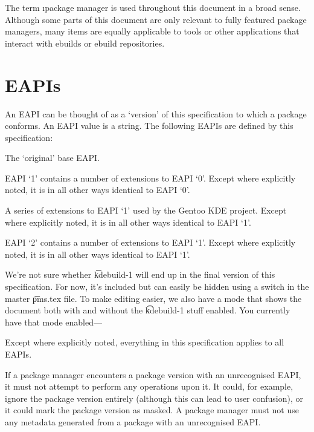 The term \i{package manager} is used throughout this document in a broad sense. Although some parts
of this document are only relevant to fully featured package managers, many items are equally
applicable to tools or other applications that interact with ebuilds or ebuild repositories.

\section{EAPIs}

An EAPI can be thought of as a `version' of this specification to which a package conforms. An EAPI
value is a string. The following EAPIs are defined by this specification:

\begin{description}
\item[0] The `original' base EAPI.
\item[1] EAPI `1' contains a number of extensions to EAPI `0'. Except where explicitly noted, it is
    in all other ways identical to EAPI `0'.
\IFKDEBUILDELSE
{
    \item[kdebuild-1] A series of extensions to EAPI `1' used by the Gentoo KDE project. Except where
        explicitly noted, it is in all other ways identical to EAPI `1'.
}{
}
\item[2] EAPI `2' contains a number of extensions to EAPI `1'. Except where explicitly noted, it is
    in all other ways identical to EAPI `1'.
\end{description}

{
    \note We're not sure whether \t{kdebuild-1} will end up in the final version of this
    specification. For now, it's included but can easily be hidden using a switch in the master
    \t{pms.tex} file. To make editing easier, we also have a mode that shows the document both with
    and without the \t{kdebuild-1} stuff enabled. You currently have that mode enabled---
}{
}

Except where explicitly noted, everything in this specification applies to all EAPIs.

If a package manager encounters a package version with an unrecognised EAPI, it must not attempt to
perform any operations upon it. It could, for example, ignore the package version entirely (although
this can lead to user confusion), or it could mark the package version as masked. A package manager
must not use any metadata generated from a package with an unrecognised EAPI.

